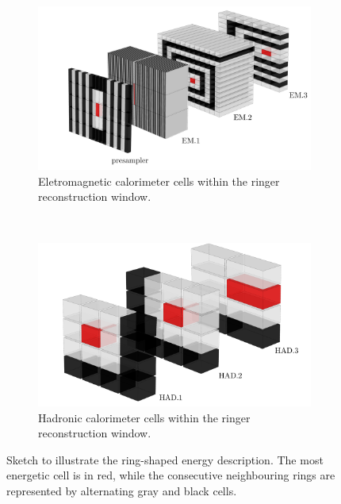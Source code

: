 \begin{figure}[h!t]
	\centering
	\begin{center}
		\begin{subfigure}[c]{.95\textwidth}
			\centering
			\includegraphics[width=\textwidth]{sections/02_ringer/figures/ATLAS_EM_Layers_v5.pdf}
			\caption{Eletromagnetic calorimeter cells within the ringer reconstruction window.}
		\end{subfigure} \\
		\begin{subfigure}[c]{.95\textwidth}
			\centering
			\includegraphics[width=\textwidth]{sections/02_ringer/figures/ATLAS_HAD_Layers_v5.pdf}
			\caption{Hadronic calorimeter cells within the ringer reconstruction window.}
		\end{subfigure}
	\end{center}
	\caption{\label{fig:calo_rings}
		Sketch to illustrate the ring-shaped energy description.
		The most energetic cell is in red, while the consecutive neighbouring rings are represented by alternating gray and black cells.
	}
\end{figure}

